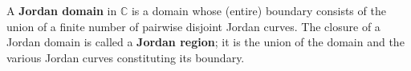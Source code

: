 A \textbf{Jordan domain} in $\mathbb{C}$ is a domain whose (entire) boundary consists of the union of a finite number of pairwise disjoint Jordan curves. The closure of a Jordan domain is called a \textbf{Jordan region}; it is the union of the domain and the various Jordan curves constituting its boundary.
